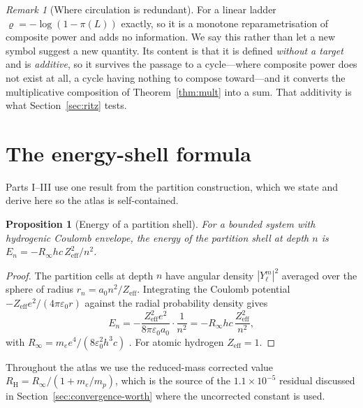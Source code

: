 \documentclass[11pt,a4paper]{article}
\theoremstyle{stmtstyle}
\newtheorem{proposition}{Proposition}
\theoremstyle{definition}
\theoremstyle{remark}
\newtheorem*{remark}{Remark}
\newcommand{\pow}{\pi}
\newcommand{\circu}{\varrho}
\newcommand{\Lad}{L}
\begin{document}
\begin{remark}[Where circulation is redundant]
\label{rem:rho-honest}
For a linear ladder $\circu=-\log(1-\pow(\Lad))$ exactly, so it is a
monotone reparametrisation of composite power and adds no information. We
say this rather than let a new symbol suggest a new quantity. Its content is
that it is defined \emph{without a target} and is \emph{additive}, so it
survives the passage to a cycle---where composite power does not exist at
all, a cycle having nothing to compose toward---and it converts the
multiplicative composition of Theorem~\ref{thm:mult} into a sum. That
additivity is what Section~\ref{sec:ritz} tests.
\end{remark}

\section{The energy-shell formula}
\label{sec:methods_derivations}

Parts I--III use one result from the partition construction, which we state
and derive here so the atlas is self-contained.

\begin{proposition}[Energy of a partition shell]
\label{prop:shell}
For a bounded system with hydrogenic Coulomb envelope, the energy of the
partition shell at depth $n$ is $E_n=-R_\infty hc\,Z_{\mathrm{eff}}^{2}/n^{2}$.
\end{proposition}

\begin{proof}
The partition cells at depth $n$ have angular density $|Y_\ell^m|^{2}$
averaged over the sphere of radius $r_n=a_0n^{2}/Z_{\mathrm{eff}}$. Integrating
the Coulomb potential $-Z_{\mathrm{eff}}e^{2}/(4\pi\varepsilon_0 r)$ against
the radial probability density gives
\begin{equation}
E_{n}=-\frac{Z_{\mathrm{eff}}^{2}e^{2}}{8\pi\varepsilon_{0}a_{0}}\cdot\frac{1}{n^{2}}
     =-R_{\infty}hc\,\frac{Z_{\mathrm{eff}}^{2}}{n^{2}},
\end{equation}
with $R_{\infty}=m_{e}e^{4}/(8\varepsilon_{0}^{2}h^{3}c)$
\citep{codata2022}. For atomic hydrogen $Z_{\mathrm{eff}}=1$.
\end{proof}

Throughout the atlas we use the reduced-mass corrected value
$R_{\mathrm H}=R_{\infty}/(1+m_{e}/m_{p})$, which is the source of the
$1.1\times10^{-5}$ residual discussed in
Section~\ref{sec:convergence-worth} where the uncorrected constant is used.
\end{document}
